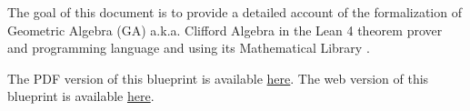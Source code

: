 The goal of this document is to provide a detailed account
of the formalization of Geometric Algebra (GA) a.k.a. Clifford Algebra \cite{hestenes2012clifford}
in the Lean 4 theorem prover and programming language \cite{moura2021lean, lean_2015, ullrich2023extensible}
and using its Mathematical Library \Mathlib \cite{themathlibcommunityLeanMathematicalLibrary2020}.

\ifplastex
The PDF version of this blueprint is available \href{./blueprint.pdf}{here}.
\else
The web version of this blueprint is available \href{https://utensil.github.io/lean-ga/blueprint/}{here}.
\fi






